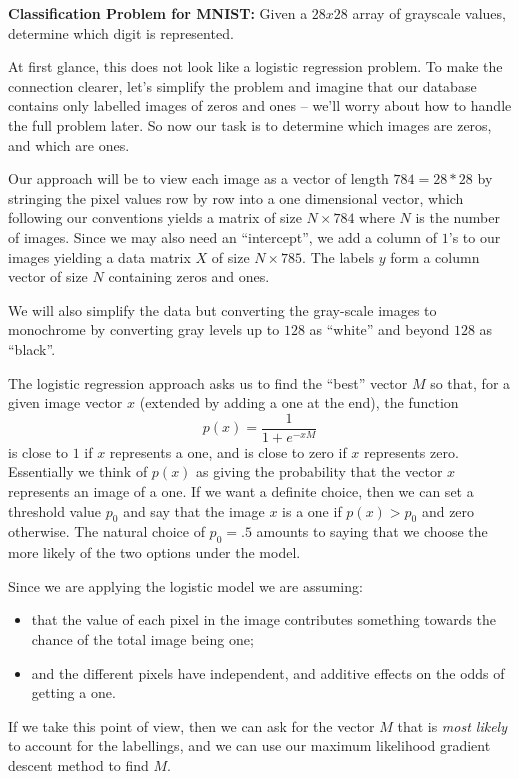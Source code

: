 \documentclass[
  11pt,
  letterpaper,
]{scrbook}
\providecommand{\tightlist}{%
  \setlength{\itemsep}{0pt}\setlength{\parskip}{0pt}}\usepackage{longtable,booktabs,array}
\theoremstyle{plain}
\theoremstyle{plain}
\theoremstyle{remark}
\begin{document}
\textbf{Classification Problem for MNIST:} Given a \(28x28\) array of
grayscale values, determine which digit is represented.

At first glance, this does not look like a logistic regression problem.
To make the connection clearer, let's simplify the problem and imagine
that our database contains only labelled images of zeros and ones --
we'll worry about how to handle the full problem later. So now our task
is to determine which images are zeros, and which are ones.

Our approach will be to view each image as a vector of length
\(784=28*28\) by stringing the pixel values row by row into a one
dimensional vector, which following our conventions yields a matrix of
size \(N\times 784\) where \(N\) is the number of images. Since we may
also need an ``intercept'', we add a column of \(1\)'s to our images
yielding a data matrix \(X\) of size \(N\times 785\). The labels \(y\)
form a column vector of size \(N\) containing zeros and ones.

We will also simplify the data but converting the gray-scale images to
monochrome by converting gray levels up to \(128\) as ``white'' and
beyond \(128\) as ``black''.

The logistic regression approach asks us to find the ``best'' vector
\(M\) so that, for a given image vector \(x\) (extended by adding a one
at the end), the function \[
p(x)=\frac{1}{1+e^{-xM}}
\] is close to \(1\) if \(x\) represents a one, and is close to zero if
\(x\) represents zero. Essentially we think of \(p(x)\) as giving the
probability that the vector \(x\) represents an image of a one. If we
want a definite choice, then we can set a threshold value \(p_0\) and
say that the image \(x\) is a one if \(p(x)>p_0\) and zero otherwise.
The natural choice of \(p_0=.5\) amounts to saying that we choose the
more likely of the two options under the model.

Since we are applying the logistic model we are assuming:

\begin{itemize}
\tightlist
\item
  that the value of each pixel in the image contributes something
  towards the chance of the total image being one;
\item
  and the different pixels have independent, and additive effects on the
  odds of getting a one.
\end{itemize}

If we take this point of view, then we can ask for the vector \(M\) that
is \emph{most likely} to account for the labellings, and we can use our
maximum likelihood gradient descent method to find \(M\).
\end{document}
